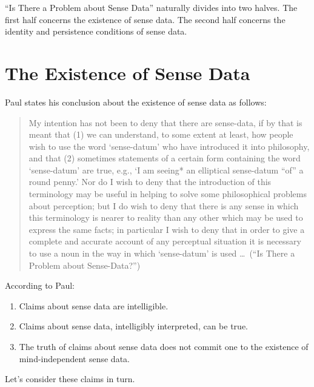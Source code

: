 \documentclass[11pt]{article}
\begin{document}
``Is There a Problem about Sense Data'' naturally divides into two halves. The first half concerns the existence of sense data. The second half concerns the identity and persistence conditions of sense data.

\section{The Existence of Sense Data} %
\label{sec:the_existence_of_sense_data}

Paul states his conclusion about the existence of sense data as follows:
\begin{quote}
    My intention has not been to deny that there are sense-data, if by that is meant that (1) we can understand, to some extent at least, how people wish to use the word `sense-datum' who have introduced it into philosophy, and that (2) sometimes statements of a certain form containing the word `sense-datum' are true, e.g., `I am seeing* an elliptical sense-datum ``of'' a round penny.' Nor do I wish to deny that the introduction of this terminology may be useful in helping to solve some philosophical problems about perception; but I do wish to deny that there is any sense in which this terminology is nearer to reality than any other which may be used to express the same facts; in particular I wish to deny that in order to give a complete and accurate account of any perceptual situation it is necessary to use a noun in the way in which `sense-datum' is used \ldots\ (``Is There a Problem about Sense-Data?'')
\end{quote}
According to Paul: 
\begin{enumerate}
    \item Claims about sense data are intelligible.
    \item Claims about sense data, intelligibly interpreted, can be true.
    \item The truth of claims about sense data does not commit one to the existence of mind-independent sense data.
\end{enumerate}
Let's consider these claims in turn.
\end{document}
